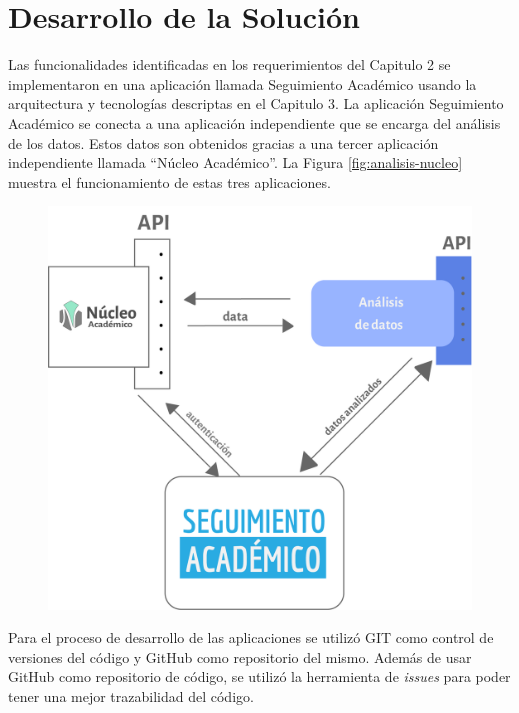 \chapter{Desarrollo de la Solución}
\label{sec:desarrollo}

Las funcionalidades identificadas en los requerimientos del Capitulo 2 se implementaron en una aplicación llamada Seguimiento Académico usando la arquitectura y tecnologías descriptas en el Capitulo 3.
La aplicación Seguimiento Académico se conecta a una aplicación independiente que se encarga del análisis de los datos. Estos datos son obtenidos gracias a una tercer aplicación independiente llamada “Núcleo Académico”.
La Figura \ref{fig:analisis-nucleo} muestra el funcionamiento de estas tres aplicaciones.


\begin{figure}[H]
  \centering
    \includegraphics[scale=0.8]{images/seguimiento-academico/flow-seguimiento-academico.png}
  \label{fig:analisis-datos}
\end{figure}

Para el proceso de desarrollo de las aplicaciones se utilizó GIT como control de versiones del código y GitHub como repositorio del mismo. Además de usar GitHub como repositorio de código, se utilizó la herramienta de \textit{issues} para poder tener una mejor trazabilidad del código.

